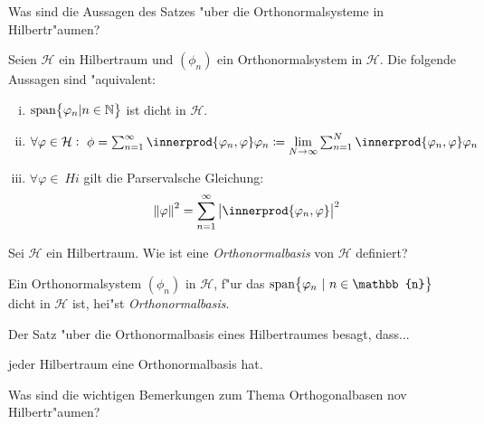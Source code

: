 \documentclass[9pt]{article}
\DeclarePairedDelimiter{\innerprod}\langle\rangle
\newcommand{\Hi}{\mathcal{H}}
\newenvironment{field}{}{\newpage}
\newif\ifnote
\newenvironment{note}{\notetrue}{\notefalse}
\newcommand{\localtag}{}
\newcommand{\globaltag}{}
\newcommand{\uuid}{}
\newcommand{\tags}[1]{
    \ifnote 
        \renewcommand{\localtag}{#1}
    \else
        \renewcommand{\globaltag}{#1}
    \fi 
    }
\newcommand{\xplain}[1]{\renewcommand{\uuid}{#1}}
\begin{document}
	\begin{note}
		\xplain{c58d8f6d-bf9c-4a49-9dcc-5f2f8231b510}
		\tags{satz, ONS, 5.2.13}
		
		\begin{field}  %
			Was sind die Aussagen des Satzes "uber die Orthonormalsysteme in Hilbertr"aumen?
		\end{field}
		
		\begin{field}  %
			Seien $\Hi$ ein Hilbertraum und $(\phi_n)$ ein Orthonormalsystem in $\Hi$. Die folgende Aussagen sind "aquivalent:
			\begin{enumerate}[i)]
				\item $\text{span}\qty{\varphi_n | n\in \mathbb{N}}$ ist dicht in $\Hi$.
				\item $\forall \varphi \in \Hi: \ \phi = \sum_{n=1}^\infty \innerprod{\varphi_n, \varphi}\varphi_n \coloneqq \lim\limits_{N\rightarrow \infty}\sum_{n=1}^N \innerprod{\varphi_n, \varphi}\varphi_n$
				\item $\forall \varphi \in \ Hi$ gilt die Parservalsche Gleichung:
					\begin{equation*}
						\norm{\varphi}^2 = \sum_{n=1}^\infty\abs{\innerprod{\varphi_n, \varphi}}^2
					\end{equation*}
			\end{enumerate} 
		\end{field}
		
		\begin{field}  %
			Sei $\Hi$ ein Hilbertraum. Wie ist eine \textit{Orthonormalbasis} von $\Hi$ definiert? 
		\end{field}
			
		\begin{field}  %
			Ein Orthonormalsystem $(\phi_n)$ in $\Hi$, f"ur das $\text{span}\qty{\varphi_n \ | \ n\in \mathbb{n}}$ dicht in $\Hi$ ist, hei"st \textit{Orthonormalbasis}. 
		\end{field}
			
		\begin{field}  %
			Der Satz "uber die Orthonormalbasis eines Hilbertraumes besagt, dass...
		\end{field}
		
		\begin{field}  %
			jeder Hilbertraum eine Orthonormalbasis hat. 
		\end{field}
			
		\begin{field}  %
			Was sind die wichtigen Bemerkungen zum Thema Orthogonalbasen nov Hilbertr"aumen?
		\end{field}
		

\end{note}
\end{document}
